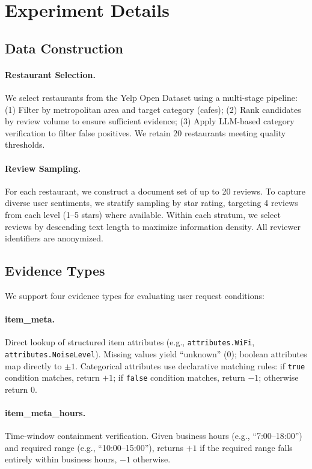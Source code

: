 \section{Experiment Details}
\label{app:experiment}

\subsection{Data Construction}

\paragraph{Restaurant Selection.}
We select restaurants from the Yelp Open Dataset using a multi-stage pipeline:
(1) Filter by metropolitan area and target category (cafes);
(2) Rank candidates by review volume to ensure sufficient evidence;
(3) Apply LLM-based category verification to filter false positives.
We retain 20 restaurants meeting quality thresholds.

\paragraph{Review Sampling.}
For each restaurant, we construct a document set of up to 20 reviews.
To capture diverse user sentiments, we stratify sampling by star rating, targeting 4 reviews from each level (1--5 stars) where available.
Within each stratum, we select reviews by descending text length to maximize information density.
All reviewer identifiers are anonymized.

\subsection{Evidence Types}

We support four evidence types for evaluating user request conditions:

\paragraph{item\_meta.}
Direct lookup of structured item attributes (e.g., \texttt{attributes.WiFi}, \texttt{attributes.NoiseLevel}).
Missing values yield ``unknown'' (0); boolean attributes map directly to $\pm 1$.
Categorical attributes use declarative matching rules: if \texttt{true} condition matches, return $+1$; if \texttt{false} condition matches, return $-1$; otherwise return $0$.

\paragraph{item\_meta\_hours.}
Time-window containment verification.
Given business hours (e.g., ``7:00--18:00'') and required range (e.g., ``10:00--15:00''), returns $+1$ if the required range falls entirely within business hours, $-1$ otherwise.

